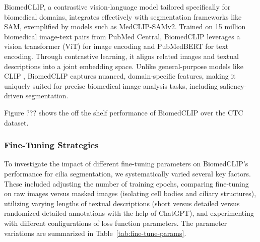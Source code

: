 \documentclass[./dissertation.tex]{subfiles}
\begin{document}

BiomedCLIP, a contrastive vision-language model tailored specifically for biomedical domains, integrates effectively with segmentation frameworks like SAM, exemplified by models such as MedCLIP-SAMv2. Trained on 15 million biomedical image-text pairs from PubMed Central, BiomedCLIP leverages a vision transformer (ViT) for image encoding and PubMedBERT \cite{gu2021domain} for text encoding. Through contrastive learning, it aligns related images and textual descriptions into a joint embedding space. Unlike general-purpose models like CLIP \cite{radford2021learning}, BiomedCLIP captures nuanced, domain-specific features, making it uniquely suited for precise biomedical image analysis tasks, including saliency-driven segmentation.

Figure ??? shows the off the shelf performance of BiomedCLIP over the CTC dataset.
\subsubsection{Fine-Tuning Strategies}



To investigate the impact of different fine-tuning parameters on BiomedCLIP's performance for cilia segmentation, we systematically varied several key factors. These included adjusting the number of training epochs, comparing fine-tuning on raw images versus masked images (isolating cell bodies and ciliary structures), utilizing varying lengths of textual descriptions (short versus detailed versus randomized detailed annotations with the help of ChatGPT), and experimenting with different configurations of loss function parameters. The parameter variations are summarized in Table~\ref{tab:fine-tune-params}.
\end{document}

